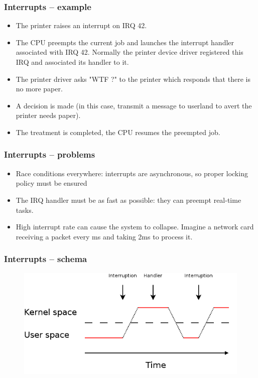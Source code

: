 \documentclass{beamer}
\begin{document}
\begin{frame}
  \frametitle{Interrupts -- example}

  \begin{itemize}
  \item<1->
    The printer raises an interrupt on IRQ 42.
  \item<2->
    The CPU preempts the current job and launches the interrupt handler associated with IRQ 42. Normally the printer device driver registered this IRQ and associated its handler to it.
  \item<3->
    The printer driver asks "WTF ?" to the printer which responds that there is no more paper.
  \item<4->
    A decision is made (in this case, transmit a message to userland to avert the printer needs paper).
  \item<5->
    The treatment is completed, the CPU resumes the preempted job.
  \end{itemize}
\end{frame}

\begin{frame}
  \frametitle{Interrupts -- problems}

  \begin{itemize}
  \item
    Race conditions everywhere: interrupts are asynchronous, so proper locking policy must be ensured
  \item
    The IRQ handler must be as fast as possible: they can preempt real-time tasks.
  \item
    High interrupt rate can cause the system to collapse. Imagine a network card receiving a packet every ms and taking 2ms to process it.
  \end{itemize}
\end{frame}

\begin{frame}
  \frametitle{Interrupts -- schema}

  \begin{figure}
  \includegraphics[scale=0.38]{interrupts.png}
  \end{figure}
\end{frame}
\end{document}
